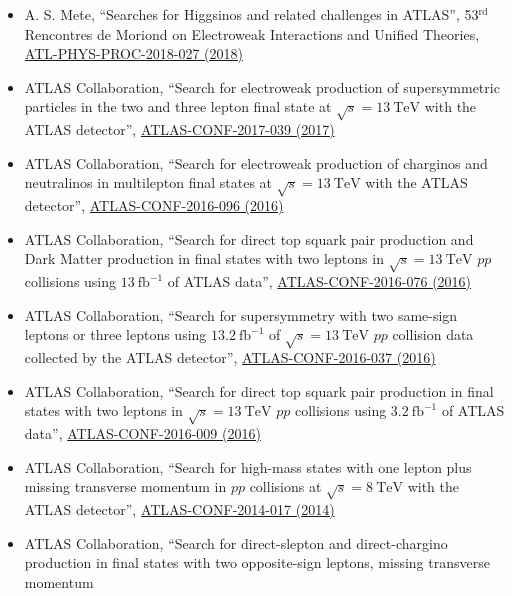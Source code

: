 \documentclass[a4paper,10pt]{article}
\begin{document}
\begin{itemize}
	\item A. S. Mete,
	``Searches for Higgsinos and related challenges in ATLAS'',
	53$^{\mathrm{rd}}$ Rencontres de Moriond on Electroweak Interactions and Unified Theories,
	\href{https://cds.cern.ch/record/1478973}{ATL-PHYS-PROC-2018-027 (2018)}
	\item ATLAS Collaboration,
	``Search for electroweak production of supersymmetric particles in the two and three lepton final state at $\sqrt{s}=13\ \mathrm{TeV}$ with the ATLAS detector'',
	\href{https://atlas.web.cern.ch/Atlas/GROUPS/PHYSICS/CONFNOTES/ATLAS-CONF-2017-039/}{ATLAS-CONF-2017-039 (2017)}
	\item ATLAS Collaboration,
	``Search for electroweak production of charginos and neutralinos in multilepton final states at $\sqrt{s}=13\ \mathrm{TeV}$ with the ATLAS detector'',
	\href{https://atlas.web.cern.ch/Atlas/GROUPS/PHYSICS/CONFNOTES/ATLAS-CONF-2016-096/}{ATLAS-CONF-2016-096 (2016)}
	\item ATLAS Collaboration,
	``Search for direct top squark pair production and Dark Matter production in final states with two leptons in $\sqrt{s}=13\ \mathrm{TeV}$ $pp$ collisions using $13\ \mathrm{fb}^{-1}$ of ATLAS data'',
	\href{https://atlas.web.cern.ch/Atlas/GROUPS/PHYSICS/CONFNOTES/ATLAS-CONF-2016-076/}{ATLAS-CONF-2016-076 (2016)}
	\item ATLAS Collaboration,
	``Search for supersymmetry with two same-sign leptons or three leptons using $13.2\ \mathrm{fb}^{-1}$ of $\sqrt{s}=13\ \mathrm{TeV}$ $pp$ collision data collected by the ATLAS detector'',
	\href{https://atlas.web.cern.ch/Atlas/GROUPS/PHYSICS/CONFNOTES/ATLAS-CONF-2016-037/}{ATLAS-CONF-2016-037 (2016)}
	\item ATLAS Collaboration,
	``Search for direct top squark pair production in final states with two leptons in $\sqrt{s}=13\ \mathrm{TeV}$ $pp$ collisions using $3.2\ \mathrm{fb}^{-1}$ of ATLAS data'',
	\href{https://atlas.web.cern.ch/Atlas/GROUPS/PHYSICS/CONFNOTES/ATLAS-CONF-2016-009/}{ATLAS-CONF-2016-009 (2016)}
	\item ATLAS Collaboration,
	``Search for high-mass states with one lepton plus missing transverse momentum in $pp$ collisions at $\sqrt{s}= 8\ \mathrm{TeV}$ with the ATLAS detector'',
	\href{https://atlas.web.cern.ch/Atlas/GROUPS/PHYSICS/CONFNOTES/ATLAS-CONF-2014-017/}{ATLAS-CONF-2014-017 (2014)}
	\item ATLAS Collaboration,
	``Search for direct-slepton and direct-chargino production in final states with two opposite-sign leptons, missing transverse momentum

\end{itemize}
\end{document}
